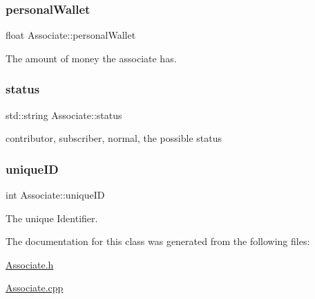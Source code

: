 \subsubsection{\texorpdfstring{personal\+Wallet}{personalWallet}}
{\footnotesize\ttfamily float Associate\+::personal\+Wallet\hspace{0.3cm}{\ttfamily [private]}}



The amount of money the associate has. 

\mbox{\label{classAssociate_aacf79a4e389c7db3d8636b788cb2089f}} 
\subsubsection{\texorpdfstring{status}{status}}
{\footnotesize\ttfamily std\+::string Associate\+::status\hspace{0.3cm}{\ttfamily [private]}}



contributor, subscriber, normal, the possible status 

\mbox{\label{classAssociate_a55a1f311ac7cb8020e9631f283cb74e6}} 
\subsubsection{\texorpdfstring{unique\+ID}{uniqueID}}
{\footnotesize\ttfamily int Associate\+::unique\+ID\hspace{0.3cm}{\ttfamily [private]}}



The unique Identifier. 



The documentation for this class was generated from the following files\+:\begin{DoxyCompactItemize}
\item 
\hyperlink{Associate_8h}{Associate.\+h}\item 
\hyperlink{Associate_8cpp}{Associate.\+cpp}\end{DoxyCompactItemize}

